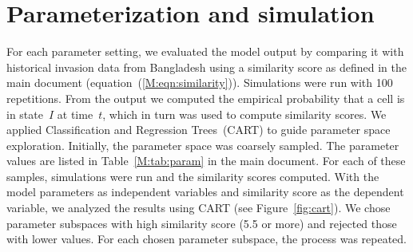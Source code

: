 \documentclass[10pt]{article}
\theoremstyle{definition}
\begin{document}
\section{Parameterization and simulation}
\label{sec:cart}
For each parameter setting, we evaluated the model output by comparing it
with historical invasion data from Bangladesh using a similarity score
as defined in the main document (equation~(\ref{M:eqn:similarity})). Simulations
were run with 100 repetitions. From the output we computed the empirical
probability that a cell is in state~$I$ at time~$t$, which in turn was used
to compute similarity scores.  We applied Classification and Regression
Trees~(CART) to guide parameter space exploration. Initially, the parameter
space was coarsely sampled. The parameter values are listed in
Table~\ref{M:tab:param} in the main document. For each of these samples, simulations were run
and the similarity scores computed. With the model parameters as independent
variables and similarity score as the dependent variable, we analyzed the results
using CART (see Figure~\ref{fig:cart}). We chose parameter subspaces with
high similarity score (5.5 or more) and rejected those with lower values.  For
each chosen parameter subspace, the process was repeated.
\end{document}
